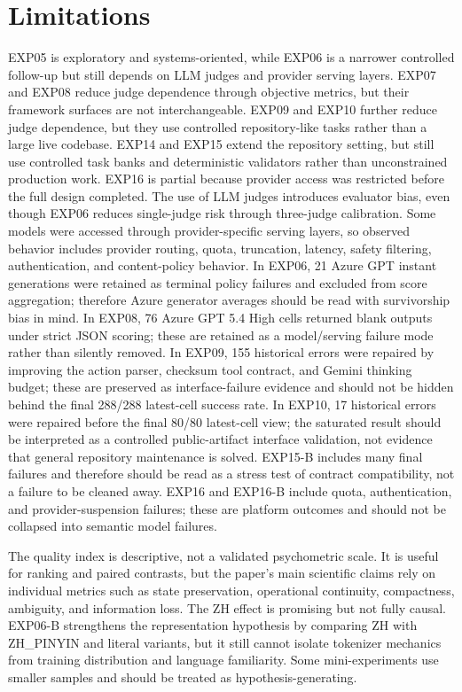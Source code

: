 \documentclass[11pt]{article}
\begin{document}
\section{Limitations}
EXP05 is exploratory and systems-oriented, while EXP06 is a narrower controlled follow-up but still depends on LLM judges and provider serving layers. EXP07 and EXP08 reduce judge dependence through objective metrics, but their framework surfaces are not interchangeable. EXP09 and EXP10 further reduce judge dependence, but they use controlled repository-like tasks rather than a large live codebase. EXP14 and EXP15 extend the repository setting, but still use controlled task banks and deterministic validators rather than unconstrained production work. EXP16 is partial because provider access was restricted before the full design completed. The use of LLM judges introduces evaluator bias, even though EXP06 reduces single-judge risk through three-judge calibration. Some models were accessed through provider-specific serving layers, so observed behavior includes provider routing, quota, truncation, latency, safety filtering, authentication, and content-policy behavior. In EXP06, 21 Azure GPT instant generations were retained as terminal policy failures and excluded from score aggregation; therefore Azure generator averages should be read with survivorship bias in mind. In EXP08, 76 Azure GPT 5.4 High cells returned blank outputs under strict JSON scoring; these are retained as a model/serving failure mode rather than silently removed. In EXP09, 155 historical errors were repaired by improving the action parser, checksum tool contract, and Gemini thinking budget; these are preserved as interface-failure evidence and should not be hidden behind the final 288/288 latest-cell success rate. In EXP10, 17 historical errors were repaired before the final 80/80 latest-cell view; the saturated result should be interpreted as a controlled public-artifact interface validation, not evidence that general repository maintenance is solved. EXP15-B includes many final failures and therefore should be read as a stress test of contract compatibility, not a failure to be cleaned away. EXP16 and EXP16-B include quota, authentication, and provider-suspension failures; these are platform outcomes and should not be collapsed into semantic model failures.

The quality index is descriptive, not a validated psychometric scale. It is useful for ranking and paired contrasts, but the paper's main scientific claims rely on individual metrics such as state preservation, operational continuity, compactness, ambiguity, and information loss. The ZH effect is promising but not fully causal. EXP06-B strengthens the representation hypothesis by comparing ZH with ZH\_PINYIN and literal variants, but it still cannot isolate tokenizer mechanics from training distribution and language familiarity. Some mini-experiments use smaller samples and should be treated as hypothesis-generating.
\end{document}
